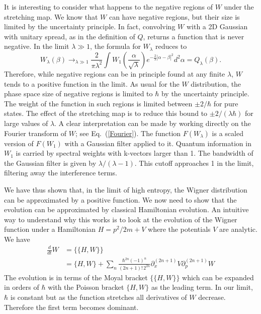 \documentclass{article}
\begin{document}
It is interesting to consider what happens to the negative regions of $W$ under the stretching map. We know that $W$ can have negative regions, but their size is limited by the uncertainty principle. In fact, convolving $W$ with a 2D Gaussian with unitary spread, as in the definition of $Q$, returns a function that is never negative. In the limit $\lambda\gg1$, the formula for $W_\lambda$ reduces to
\begin{equation}
     W_\lambda(\beta)\rightarrow_{\lambda\gg1}\frac{2}{\pi\lambda^2}\int W_1\left(\frac{\alpha}{\sqrt{\lambda}}\right)e^{-\frac{2}{\lambda}\left|\alpha-\beta\right|^2}d^2\alpha=Q_\lambda(\beta).
\end{equation}
Therefore, while negative regions can be in principle found at any finite $\lambda$, $W$ tends to a positive function in the limit. As usual for the $W$ distribution, the phase space size of negative regions is limited to $\hbar$ by the uncertainty principle. The weight of the function in such regions is limited between $\pm 2/\hbar$ for pure states. The effect of the stretching map is to reduce this bound to $\pm 2/(\lambda\hbar)$ for large values of $\lambda$. A clear interpretation can be made by working directly on the Fourier transform of $W$; see Eq.~(\ref{Fourier}). The function $F(W_\lambda)$ is a scaled version of $F(W_1)$ with a Gaussian filter applied to it. Quantum information in $W_1$ is carried by spectral weights with k-vectors larger than 1. The bandwidth of the Gaussian filter is given by $\lambda/(\lambda-1)$. This cutoff approaches 1 in the limit, filtering away the interference terms.

We have thus shown that, in the limit of high entropy, the Wigner distribution can be approximated by a positive function. We now need to show that the evolution can be approximated by classical Hamiltonian evolution. An intuitive way to understand why this works is to look at the evolution of the Wigner function under a Hamiltonian $H = p^2/2m + V$ where the potentials $V$ are analytic. We have~\cite{hillery1984distribution}
\begin{equation}
\begin{aligned}
    \frac{d}{dt} W &= \{\{H, W\}\} \\
    &= \{H, W\} + \sum_n \frac{\hbar^{2n} (-1)^n}{(2n+1)! \, 2^{2n}} \partial_x^{(2n+1)} V \partial_p^{(2n+1)} W
\end{aligned}
\end{equation}
The evolution is in terms of the Moyal bracket $\{\{H,W\}\}$ which can be expanded in orders of $\hbar$ with the Poisson bracket $\{H,W\}$ as the leading term. In our limit, $\hbar$ is constant but as the function stretches all derivatives of $W$ decrease. Therefore the first term becomes dominant.
\end{document}
